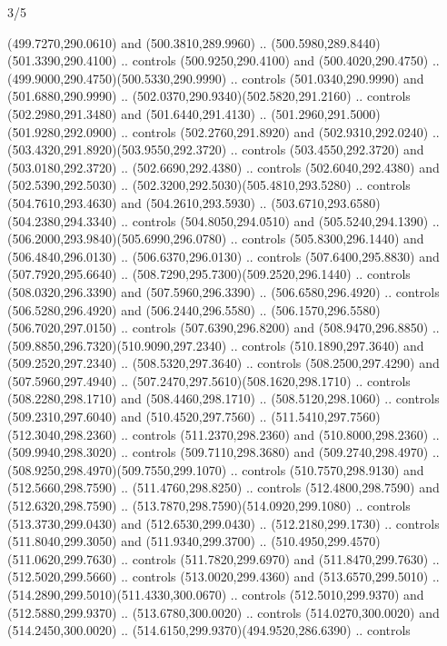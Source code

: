 \begin{flagdescription}{3/5}
\begin{scope}[shift={(0.5\flaglength,0.5\flagwidth)},scale=\flagwidth/1075]
\begin{scope}[y=0.80pt, x=0.80pt, yscale=-2.37, xscale=2.37,xshift=-402,yshift=-230.4]
  (499.7270,290.0610) and (500.3810,289.9960) ..
  (500.5980,289.8440)(501.3390,290.4100) .. controls (500.9250,290.4100) and
  (500.4020,290.4750) .. (499.9000,290.4750)(500.5330,290.9990) .. controls
  (501.0340,290.9990) and (501.6880,290.9990) ..
  (502.0370,290.9340)(502.5820,291.2160) .. controls (502.2980,291.3480) and
  (501.6440,291.4130) .. (501.2960,291.5000)(501.9280,292.0900) .. controls
  (502.2760,291.8920) and (502.9310,292.0240) ..
  (503.4320,291.8920)(503.9550,292.3720) .. controls (503.4550,292.3720) and
  (503.0180,292.3720) .. (502.6690,292.4380) .. controls (502.6040,292.4380) and
  (502.5390,292.5030) .. (502.3200,292.5030)(505.4810,293.5280) .. controls
  (504.7610,293.4630) and (504.2610,293.5930) ..
  (503.6710,293.6580)(504.2380,294.3340) .. controls (504.8050,294.0510) and
  (505.5240,294.1390) .. (506.2000,293.9840)(505.6990,296.0780) .. controls
  (505.8300,296.1440) and (506.4840,296.0130) .. (506.6370,296.0130) .. controls
  (507.6400,295.8830) and (507.7920,295.6640) ..
  (508.7290,295.7300)(509.2520,296.1440) .. controls (508.0320,296.3390) and
  (507.5960,296.3390) .. (506.6580,296.4920) .. controls (506.5280,296.4920) and
  (506.2440,296.5580) .. (506.1570,296.5580)(506.7020,297.0150) .. controls
  (507.6390,296.8200) and (508.9470,296.8850) ..
  (509.8850,296.7320)(510.9090,297.2340) .. controls (510.1890,297.3640) and
  (509.2520,297.2340) .. (508.5320,297.3640) .. controls (508.2500,297.4290) and
  (507.5960,297.4940) .. (507.2470,297.5610)(508.1620,298.1710) .. controls
  (508.2280,298.1710) and (508.4460,298.1710) .. (508.5120,298.1060) .. controls
  (509.2310,297.6040) and (510.4520,297.7560) ..
  (511.5410,297.7560)(512.3040,298.2360) .. controls (511.2370,298.2360) and
  (510.8000,298.2360) .. (509.9940,298.3020) .. controls (509.7110,298.3680) and
  (509.2740,298.4970) .. (508.9250,298.4970)(509.7550,299.1070) .. controls
  (510.7570,298.9130) and (512.5660,298.7590) .. (511.4760,298.8250) .. controls
  (512.4800,298.7590) and (512.6320,298.7590) ..
  (513.7870,298.7590)(514.0920,299.1080) .. controls (513.3730,299.0430) and
  (512.6530,299.0430) .. (512.2180,299.1730) .. controls (511.8040,299.3050) and
  (511.9340,299.3700) .. (510.4950,299.4570)(511.0620,299.7630) .. controls
  (511.7820,299.6970) and (511.8470,299.7630) .. (512.5020,299.5660) .. controls
  (513.0020,299.4360) and (513.6570,299.5010) ..
  (514.2890,299.5010)(511.4330,300.0670) .. controls (512.5010,299.9370) and
  (512.5880,299.9370) .. (513.6780,300.0020) .. controls (514.0270,300.0020) and
  (514.2450,300.0020) .. (514.6150,299.9370)(494.9520,286.6390) .. controls

\end{scope}
\end{scope}
\end{flagdescription}
